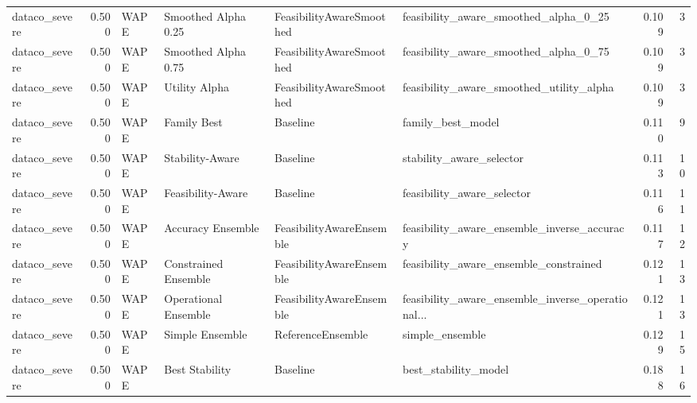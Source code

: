 \begin{table}
{\begin{tabular}{lrllllrr}
 dataco\_severe &             0.500 &                        WAPE &   Smoothed Alpha 0.25 &  FeasibilityAwareSmoothed &              feasibility\_aware\_smoothed\_alpha\_0\_25 &         0.109 &               3 \\
 dataco\_severe &             0.500 &                        WAPE &   Smoothed Alpha 0.75 &  FeasibilityAwareSmoothed &              feasibility\_aware\_smoothed\_alpha\_0\_75 &         0.109 &               3 \\
 dataco\_severe &             0.500 &                        WAPE &         Utility Alpha &  FeasibilityAwareSmoothed &           feasibility\_aware\_smoothed\_utility\_alpha &         0.109 &               3 \\
 dataco\_severe &             0.500 &                        WAPE &           Family Best &                  Baseline &                                  family\_best\_model &         0.110 &               9 \\
 dataco\_severe &             0.500 &                        WAPE &       Stability-Aware &                  Baseline &                           stability\_aware\_selector &         0.113 &              10 \\
 dataco\_severe &             0.500 &                        WAPE &     Feasibility-Aware &                  Baseline &                         feasibility\_aware\_selector &         0.116 &              11 \\
 dataco\_severe &             0.500 &                        WAPE &     Accuracy Ensemble &  FeasibilityAwareEnsemble &        feasibility\_aware\_ensemble\_inverse\_accuracy &         0.117 &              12 \\
 dataco\_severe &             0.500 &                        WAPE &  Constrained Ensemble &  FeasibilityAwareEnsemble &             feasibility\_aware\_ensemble\_constrained &         0.121 &              13 \\
 dataco\_severe &             0.500 &                        WAPE &  Operational Ensemble &  FeasibilityAwareEnsemble &  feasibility\_aware\_ensemble\_inverse\_operational... &         0.121 &              13 \\
 dataco\_severe &             0.500 &                        WAPE &       Simple Ensemble &         ReferenceEnsemble &                                    simple\_ensemble &         0.129 &              15 \\
 dataco\_severe &             0.500 &                        WAPE &        Best Stability &                  Baseline &                               best\_stability\_model &         0.188 &              16 \\

\end{tabular}}
\end{table}
